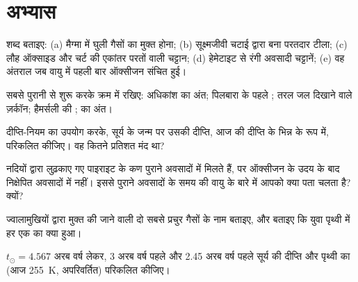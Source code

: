 \section{अभ्यास}

\begin{exercise}[$\star$]\label{exo:g12:early-earth:1}
शब्द बताइए: (a) मैग्मा में घुली गैसों का मुक्त होना; (b) सूक्ष्मजीवी चटाई द्वारा बना
परतदार टीला; (c) लौह ऑक्साइड और चर्ट की एकांतर परतों वाली चट्टान;
(d) हेमेटाइट से रंगी अवसादी चट्टानें; (e) वह अंतराल
जब वायु में पहली बार ऑक्सीजन संचित हुई।
\end{exercise}

\begin{exercise}[$\star$]\label{exo:g12:early-earth:2}
सबसे पुरानी से शुरू करके क्रम में रखिए: अधिकांश  का अंत;
पिलबारा के पहले ; तरल जल दिखाने वाले ज़र्कॉन;
हैमर्सली की ;  का अंत।
\end{exercise}

\begin{exercise}[$\star$]\label{exo:g12:early-earth:3}
दीप्ति-नियम का उपयोग करके, सूर्य के जन्म पर उसकी दीप्ति, आज की दीप्ति के
भिन्न के रूप में, परिकलित कीजिए। वह कितने प्रतिशत मंद था?
\end{exercise}

\begin{exercise}[$\star$]\label{exo:g12:early-earth:4}
नदियों द्वारा लुढ़काए गए पाइराइट के कण पुराने अवसादों में मिलते हैं, पर
ऑक्सीजन के उदय के बाद निक्षेपित अवसादों में नहीं। इससे पुराने अवसादों के समय की
वायु के बारे में आपको क्या पता चलता है? क्यों?
\end{exercise}

\begin{exercise}[$\star$]\label{exo:g12:early-earth:5}
ज्वालामुखियों द्वारा मुक्त की जाने वाली दो सबसे प्रचुर गैसों के नाम बताइए, और बताइए कि युवा
पृथ्वी में हर एक का क्या हुआ।
\end{exercise}

\begin{exercise}[$\star\star$]\label{exo:g12:early-earth:6}
$t_\odot = 4.567$ अरब वर्ष लेकर, 3 अरब वर्ष पहले और 2.45 अरब वर्ष पहले
सूर्य की दीप्ति और पृथ्वी का  (आज
\qty{255}{K},  अपरिवर्तित) परिकलित कीजिए।
\end{exercise}

